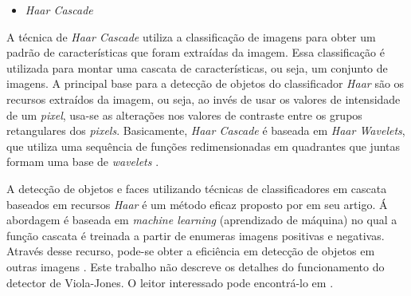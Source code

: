 \begin{itemize}
\raggedright \item \label{itm:haarcascade} \textit{Haar Cascade}
\end{itemize}
 
A técnica de \textit{Haar Cascade} utiliza a classificação de imagens para obter um padrão de características que foram extraídas da imagem. Essa classificação é utilizada para montar uma cascata de características, ou seja, um conjunto de imagens. A principal base para a detecção de objetos do classificador \textit{Haar} são os recursos extraídos da imagem, ou seja, ao invés de usar os valores de intensidade de um \textit{pixel}, usa-se as alterações nos valores de contraste entre os grupos retangulares dos \textit{pixels}. Basicamente, \textit{Haar Cascade} é baseada em \textit{Haar Wavelets}, que utiliza uma sequência de funções redimensionadas em quadrantes que juntas formam uma base de \textit{wavelets} \cite{WILSON2006}.

A detecção de objetos e faces utilizando técnicas de classificadores em cascata baseados em recursos \textit{Haar} é um método eficaz proposto por  em seu artigo. Á abordagem é baseada em \textit{machine learning} (aprendizado de máquina) no qual a função cascata é treinada a partir de enumeras imagens positivas e negativas. Através desse recurso, pode-se obter a eficiência em detecção de objetos em outras imagens \cite{OpenCV}. Este trabalho não descreve os detalhes do funcionamento do detector de Viola-Jones. O leitor interessado pode encontrá-lo em \cite{VIOLA2001}.